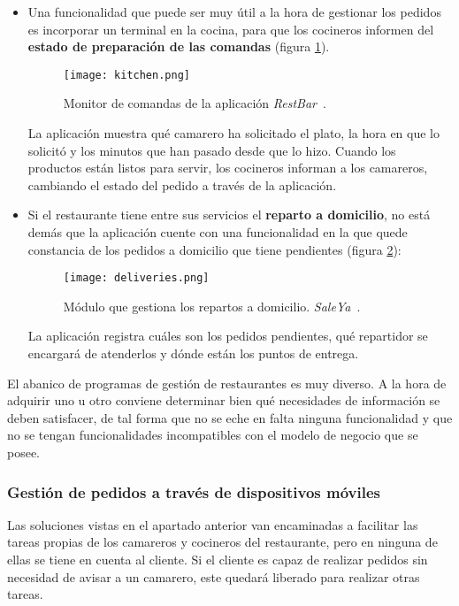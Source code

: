 \begin{itemize}
    \item Una funcionalidad que puede ser muy útil a la hora de gestionar
    los pedidos es incorporar un terminal en la cocina, para que los cocineros
    informen del \textbf{estado de preparación de las comandas} (figura
    \ref{fig:kitchen}).

    \begin{figure}[!h]
      \begin{center}
        \texttt{[image: kitchen.png]}
        \caption{Monitor de comandas de la aplicación
        \emph{RestBar}~\cite{bib:restBar}.}
        \label{fig:kitchen}
      \end{center}
    \end{figure}
    
    La aplicación muestra qué camarero ha solicitado el plato, la hora en que
    lo solicitó y los minutos que han pasado desde que lo hizo. Cuando los
    productos están listos para servir, los cocineros informan a los
    camareros, cambiando el estado del pedido a través de la aplicación.

    \item Si el restaurante tiene entre sus servicios el \textbf{reparto a
    domicilio}, no está demás que la aplicación cuente con una funcionalidad
    en la que quede constancia de los pedidos a domicilio que tiene pendientes
    (figura \ref{fig:deliveries}):

    \begin{figure}[!h]
      \begin{center}
        \texttt{[image: deliveries.png]}
        \caption{Módulo que gestiona los repartos a domicilio.
        \emph{SaleYa}~\cite{bib:saleYa}.}
        \label{fig:deliveries}
      \end{center}
    \end{figure}

    La aplicación registra cuáles son los pedidos pendientes, qué repartidor
    se encargará de atenderlos y dónde están los puntos de entrega.
    \end{itemize}

    El abanico de programas de gestión de restaurantes es muy diverso. A la
    hora de adquirir uno u otro conviene determinar bien qué necesidades de
    información se deben satisfacer, de tal forma que no se eche en falta 
    ninguna funcionalidad y que no se tengan funcionalidades incompatibles
    con el modelo de negocio que se posee.

    \subsubsection{Gestión de pedidos a través de dispositivos móviles}
    Las soluciones vistas en el apartado anterior van encaminadas a
    facilitar las tareas propias de los camareros y cocineros del restaurante,
    pero en ninguna de ellas se tiene en cuenta al cliente. Si el cliente es
    capaz de realizar pedidos sin necesidad de avisar a un camarero, este
    quedará liberado para realizar otras tareas.

